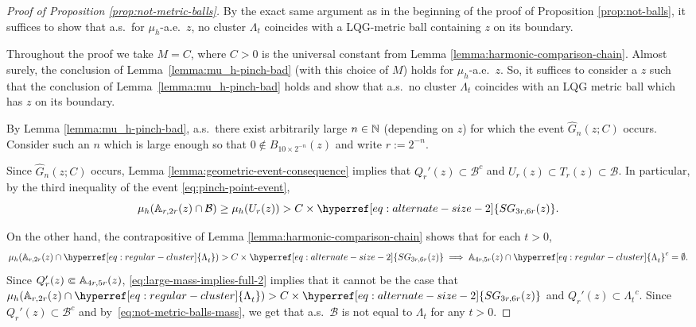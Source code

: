 \documentclass[12pt]{amsart}
\numberwithin{equation}{section}
\newcommand{\regcluster}[2]{\hyperref[eq:regular-cluster]{\Lambda^{#1}_{#2}}}
\newcommand{\SGrho}[2]{\hyperref[eq:alternate-size-2]{SG_{#1}(#2)}}
\begin{document}
	\begin{proof}[Proof of Proposition \ref{prop:not-metric-balls}]
		By the exact same argument as in the beginning of the proof of Proposition \ref{prop:not-balls}, it suffices to show that a.s.\ for $\mu_h$-a.e.\ $z$, no cluster ${\regcluster{}{t}}$
		coincides with a LQG-metric ball containing $z$ on its boundary. 
		
		Throughout the proof we take $M = C$, where $C > 0$ is the universal constant from Lemma \ref{lemma:harmonic-comparison-chain}. Almost surely, the conclusion of Lemma~\ref{lemma:mu_h-pinch-bad} (with this choice of $M$) holds for $\mu_h$-a.e.\ $z$. So, it suffices to consider a $z$ such that the conclusion of Lemma~\ref{lemma:mu_h-pinch-bad} holds and show that a.s.\ no cluster ${\regcluster{}{t}}$ coincides with an LQG metric ball which has $z$ on its boundary.	
		
		By Lemma \ref{lemma:mu_h-pinch-bad}, a.s.\ there exist arbitrarily large $n \in \mathbb{N}$  (depending on $z$) for which the event $\hat G_n(z; C)$ occurs. 
		Consider such an $n$ which is large enough so that $0\notin B_{10 \times 2^{-n}}(z)$ and write $r := 2^{-n}$. 
		
		Since $\hat G_n(z;C)$ occurs, Lemma \ref{lemma:geometric-event-consequence}
		implies that $Q_r'(z) \subset \mathcal{B}^c$ and $U_r (z) \subset T_r(z) \subset \mathcal{B}$. In particular, by the third inequality of the event \eqref{eq:pinch-point-event}, 
		\begin{equation} \label{eq:not-metric-balls-mass}
		\mu_h( \A_{r, 2r}(z) \cap \mathcal{B}) \geq \mu_h(U_r(z)) > C \times \SGrho{3r,6r}{z}.
		\end{equation}
		
		On the other hand, the contrapositive of Lemma \ref{lemma:harmonic-comparison-chain} shows that for each $t>0$, 
		\begin{equation} \label{eq:large-mass-implies-full-2}
		\mu_h(\A_{r, 2r}(z) \cap {\regcluster{}{t}}) > C \times \SGrho{3r,6r}{z} \implies \A_{4r, 5r}(z) \cap {{\regcluster{}{t}}}^c = \emptyset .
		\end{equation}
		Since $Q_r'(z) \Subset \mathbb{A}_{4r, 5r}(z)$, \eqref{eq:large-mass-implies-full-2} implies that it cannot be the case that $\mu_h(\A_{r, 2r}(z) \cap {\regcluster{}{t}}) >  C \times \SGrho{3r,6r}{z}$ and $Q_r'(z) \subset {{\regcluster{}{t}}}^c$. Since $Q_r'(z) \subset \mathcal B^c$ and by~\eqref{eq:not-metric-balls-mass}, we get that a.s.\ $\mathcal B$ is not equal to ${\regcluster{}{t}}$ for any $t>0$. 
	\end{proof}
	
\end{document}
